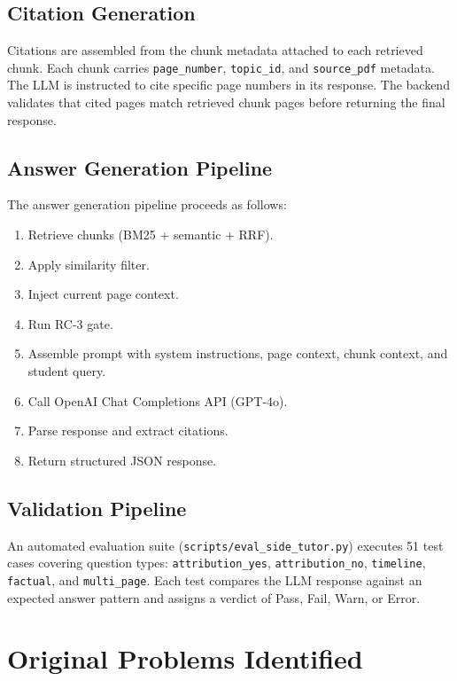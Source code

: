 \documentclass[12pt, a4paper]{report}
\newcommand{\codeinline}[1]{\texttt{#1}}
\begin{document}
\section{Citation Generation}

Citations are assembled from the chunk metadata attached to each retrieved chunk.
Each chunk carries \codeinline{page\_number}, \codeinline{topic\_id}, and
\codeinline{source\_pdf} metadata. The LLM is instructed to cite specific page
numbers in its response. The backend validates that cited pages match retrieved
chunk pages before returning the final response.

\section{Answer Generation Pipeline}

The answer generation pipeline proceeds as follows:
\begin{enumerate}[noitemsep]
  \item Retrieve chunks (BM25 + semantic + RRF).
  \item Apply similarity filter.
  \item Inject current page context.
  \item Run RC-3 gate.
  \item Assemble prompt with system instructions, page context, chunk context,
        and student query.
  \item Call OpenAI Chat Completions API (GPT-4o).
  \item Parse response and extract citations.
  \item Return structured JSON response.
\end{enumerate}

\section{Validation Pipeline}

An automated evaluation suite (\codeinline{scripts/eval\_side\_tutor.py})
executes 51 test cases covering question types: \texttt{attribution\_yes},
\texttt{attribution\_no}, \texttt{timeline}, \texttt{factual}, and
\texttt{multi\_page}. Each test compares the LLM response against an expected
answer pattern and assigns a verdict of Pass, Fail, Warn, or Error.


\chapter{Original Problems Identified}
\end{document}
